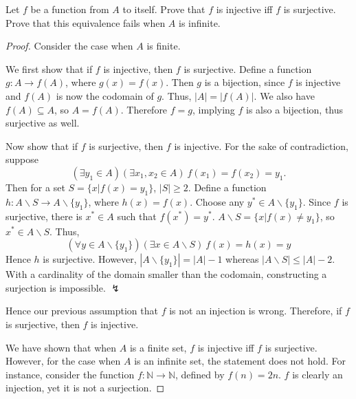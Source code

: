 \documentclass[../main.tex]{subfiles}
\begin{document}
\begin{exercise}
    Let $f$ be a function from $A$ to itself.
    Prove that $f$ is injective iff $f$ is surjective.
    Prove that this equivalence fails when $A$ is infinite.
\end{exercise}
\begin{proof}
    Consider the case when $A$ is finite.

    We first show that if $f$ is injective, then $f$ is surjective.
    Define a function $g: A \rightarrow f(A)$, where $g(x) = f(x)$.
    Then $g$ is a bijection, since $f$ is injective and $f(A)$ is now the codomain of $g$.
    Thus, $|A| = |f(A)|$.
    We also have $f(A) \subseteq A$, so $A = f(A)$.
    Therefore $f = g$, implying $f$ is also a bijection, thus surjective as well.

    Now show that if $f$ is surjective, then $f$ is injective.
    For the sake of contradiction, suppose 
    \[
        (\exists y_1 \in A)(\exists x_1, x_2 \in A)\ f(x_1) = f(x_2) = y_1.
    \]
    Then for a set $S = \{x | f(x) = y_1\}$, $|S| \geq 2$.
    Define a function $h: A \backslash S \rightarrow A \backslash \{y_1\}$, where $h(x) = f(x)$.
    Choose any $y^* \in A \backslash \{y_1\}$.
    Since $f$ is surjective, there is $x^* \in A$ such that $f(x^*) = y^*$.
    $A \backslash S = \{ x | f(x) \neq y_1\}$, so $x^* \in A \backslash S$.
    Thus, 
    \[
        (\forall y \in A \backslash \{y_1\})(\exists x \in A \backslash S)\ f(x) = h(x) = y
    \]
    Hence $h$ is surjective.
    However, $|A \backslash \{y_1\}| = |A| - 1$ whereas $|A \backslash S| \leq |A| - 2$.
    With a cardinality of the domain smaller than the codomain, constructing a surjection is impossible. $\lightning$

    Hence our previous assumption that $f$ is not an injection is wrong.
    Therefore, if $f$ is surjective, then $f$ is injective.

    We have shown that when $A$ is a finite set, $f$ is injective iff $f$ is surjective.
    However, for the case when $A$ is an infinite set, the statement does not hold.
    For instance, consider the function $f: \mathbb{N} \rightarrow \mathbb{N}$, defined by $f(n) = 2n$.
    $f$ is clearly an injection, yet it is not a surjection.
\end{proof}
\end{document}
